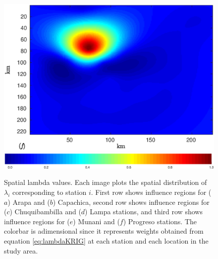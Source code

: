 {\begin{figure}[!htbp]
\includegraphics[width=0.5\columnwidth]{fig/AreaweightProgreso0}\\
\includegraphics[width=0.8\columnwidth]{fig/colorbar}
\endce
\caption{Spatial lambda values. Each image plots the spatial distribution of 
$\lambda_i$ corresponding to station $i$. First row shows
influence regions for ($a$) Arapa and ($b$) Capachica, second row shows influence regions for ($c$) Chuquibambilla and ($d$) Lampa stations, and third row shows influence regions for ($e$) Munani and ($f$) Progreso stations. The colorbar is adimensional since it represents weights obtained from equation \eqref{eq:lambdaKRIG} at each station and each location in the study area.}
\label{fig:LambdaImages}
\end{figure}

}
